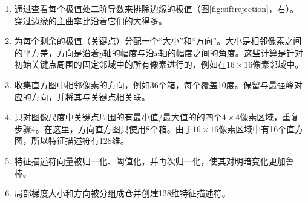 \begin{enumerate}

\item 通过查看每个极值处二阶导数来排除边缘的极值（图\ref{fig:siftrejection}，右）。穿过边缘的主曲率比沿着它们的大得多。
\item 为每个剩余的极值（关键点）分配一个“大小”和“方向”。大小是相邻像素之间的平方差，方向是沿着$y$轴的幅度与沿$x$轴的幅度之间的角度。这些计算是针对初始关键点周围的固定邻域中的所有像素进行的，例如在$16\times 16$像素邻域中。
\item 收集直方图中相邻像素的方向，例如36个箱，每个覆盖10度。保留与最强峰对应的方向，并将其与关键点相关联。
\item 只对图像尺度中关键点周围的有最小值/最大值的的四个$4\times 4$像素区域，重复步骤4。在这里，方向直方图只使用8个箱。由于$16\times 16$像素区域中有16个直方图，所以特征描述符有128维。
\item 特征描述符向量被归一化、阈值化，并再次归一化，使其对明暗变化更加鲁棒。
\item 局部梯度大小和方向被分组成仓并创建128维特征描述符。

\end{enumerate}

